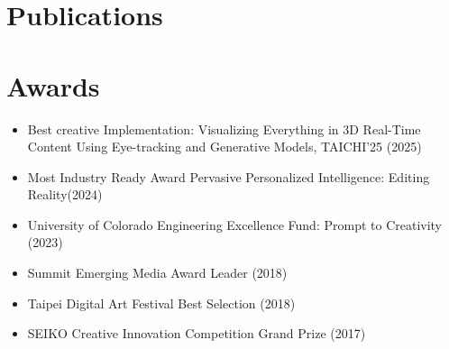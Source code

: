 \documentclass[a4paper,11pt]{article}
\begin{document}
\section*{Publications}





\section*{Awards}
\begin{itemize}
    \item
    Best creative Implementation: Visualizing Everything in 3D Real-Time Content Using Eye-tracking and Generative Models, TAICHI'25 (2025)
    \item Most Industry Ready Award Pervasive Personalized Intelligence: Editing Reality(2024)
    \item University of Colorado Engineering Excellence Fund: Prompt to Creativity (2023)
    \item Summit Emerging Media Award Leader (2018)
    \item Taipei Digital Art Festival Best Selection (2018)
    \item SEIKO Creative Innovation Competition Grand Prize (2017)
   
\end{itemize}


\end{document}
